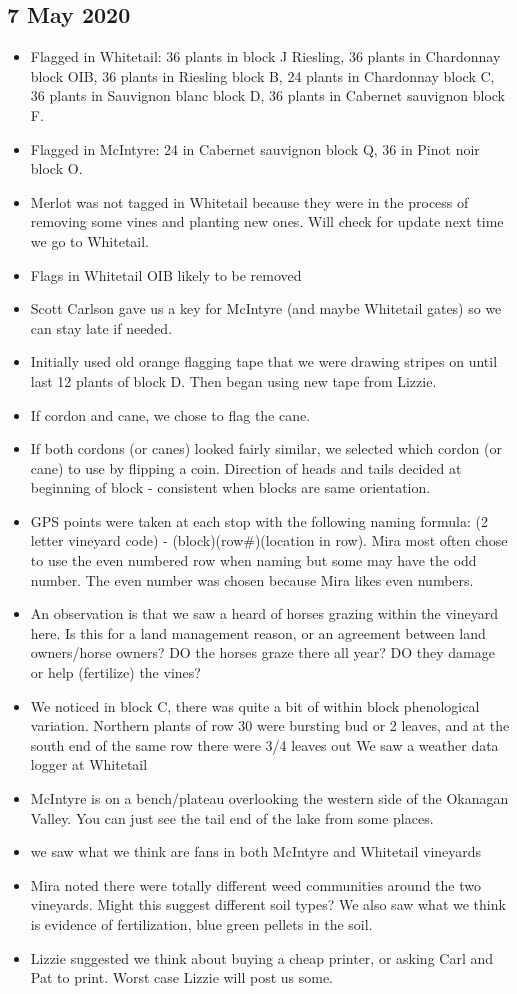 \documentclass[11pt,letter]{article}
\newenvironment{smitemize}{
\begin{itemize}
  \setlength{\itemsep}{0pt}
  \setlength{\parskip}{0.8pt}
  \setlength{\parsep}{0pt}}
{\end{itemize}
}
\begin{document}
\subsection{7 May 2020}
\begin{smitemize}
\item Flagged in Whitetail: 36 plants in block J Riesling, 36 plants in Chardonnay block OIB, 36 plants in Riesling block B, 24 plants in Chardonnay block C, 36 plants in Sauvignon blanc block D, 36 plants in Cabernet sauvignon block F.
\item Flagged in McIntyre: 24 in Cabernet sauvignon block Q, 36 in Pinot noir block O.
\item Merlot was not tagged in Whitetail because they were in the process of removing some vines and planting new ones. Will check for update next time we go to Whitetail.
\item Flags in Whitetail OIB likely to be removed
\item Scott Carlson gave us a key for McIntyre (and maybe Whitetail gates) so we can stay late if needed.
\item Initially used old orange flagging tape that we were drawing stripes on until last 12 plants of block D. Then began using new tape from Lizzie.
\item If cordon and cane, we chose to flag the cane.
\item If both cordons (or canes) looked fairly similar, we selected which cordon (or cane) to use by flipping a coin. Direction of heads and tails decided at beginning of block - consistent when blocks are same orientation.
\item GPS points were taken at each stop with the following naming formula: (2 letter vineyard code) - (block)(row\#)(location in row). Mira most often chose to use the even numbered row when naming but some may have the odd number. The even number was chosen because Mira likes even numbers.
\item An observation is that we saw a heard of horses grazing within the vineyard here. Is this for a land management reason, or an agreement between land owners/horse owners? DO the horses graze there all year? DO they damage or help (fertilize) the vines? 
\item We noticed in block C, there was quite a bit of within block phenological variation. Northern plants of row 30 were bursting bud or 2 leaves, and at the south end of the same row there were 3/4 leaves out
We saw a weather data logger at Whitetail 
\item McIntyre is on a bench/plateau overlooking the western side of the Okanagan Valley. You can just see the tail end of the lake from some places.
\item we saw what we think are fans in both McIntyre and Whitetail vineyards 
\item Mira noted there were totally different weed communities around the two vineyards. Might this suggest different soil types? We also saw what we think is evidence of fertilization, blue green pellets in the soil.
\item Lizzie suggested we think about buying a cheap printer, or asking Carl and Pat to print. Worst case Lizzie will post us some. 


\end{smitemize}
\end{document}
